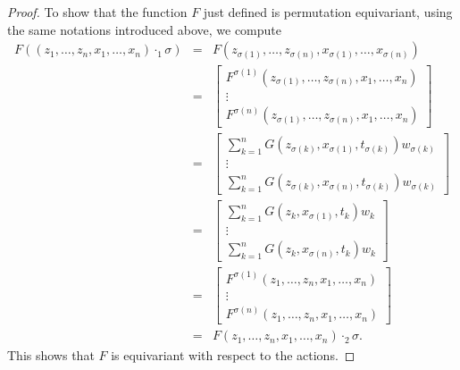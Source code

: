 \documentclass[a4paper,12pt,reqno]{amsart}
\theoremstyle{definition}
\theoremstyle{remark}
\begin{document}
\begin{proof}
        To show that the function $F$ just defined is permutation equivariant, using the same notations introduced above, we compute
        \begin{eqnarray*}
                F( (z_1, \ldots, z_n, x_1, \ldots, x_n)\cdot_1 \sigma) &=& F(z_{\sigma(1)}, \ldots, z_{\sigma(n)}, x_{\sigma(1)}, \ldots, x_{\sigma(n)})\\
                &=& \begin{bmatrix}
             F^{\sigma(1)}(z_{\sigma(1)}, \ldots, z_{\sigma(n)},x_{1}, \ldots, x_{n})\\
                \vdots\\
            F^{\sigma(n)}(z_{\sigma(1)}, \ldots, z_{\sigma(n)},x_{1}, \ldots, x_{n})
              \end{bmatrix}\\
          &=&  \begin{bmatrix}
                    \sum_{k=1}^n G(z_{\sigma(k)},x_{\sigma(1)},t_{\sigma(k)})w_{\sigma(k)}\\
                    \vdots\\
                    \sum_{k=1}^n G(z_{\sigma(k)},x_{\sigma(n)},t_{\sigma(k)})w_{\sigma(k)}
               \end{bmatrix}\\
          &=&  \begin{bmatrix}
                    \sum_{k=1}^n G(z_k,x_{\sigma(1)},t_k)w_k\\
                    \vdots\\
                    \sum_{k=1}^n G(z_k,x_{\sigma(n)},t_k)w_k
               \end{bmatrix}\\
          &=&  \begin{bmatrix}
                    F^{\sigma(1)}(z_1, \ldots, z_n,x_{1}, \ldots, x_{n})\\
                    \vdots\\
                    F^{\sigma(n)}(z_1, \ldots, z_n,x_{1}, \ldots, x_{n})
              \end{bmatrix}\\
          &=&   F(z_1, \ldots, z_n, x_1, \ldots, x_n) \cdot_2 \sigma. 
        \end{eqnarray*}
        This shows that $F$ is equivariant with respect to the actions. 
\end{proof} 
\end{document}

